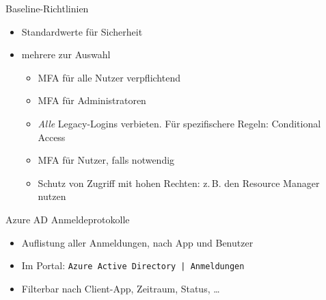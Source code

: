 \begin{flashcard}[Definition]{Baseline-Richtlinien}
    \begin{itemize}
        \item Standardwerte für Sicherheit
        \item mehrere zur Auswahl
            \begin{itemize}
                \item MFA für alle Nutzer verpflichtend
                \item MFA für Administratoren
                \item \emph{Alle} Legacy-Logins verbieten. Für spezifischere Regeln: Conditional Access
                \item MFA für Nutzer, falls notwendig
                \item Schutz von Zugriff mit hohen Rechten: z.\,B. den Resource Manager nutzen
            \end{itemize}

    \end{itemize}
\end{flashcard}



\begin{flashcard}[Definition]{Azure AD Anmeldeprotokolle}
    \begin{itemize}
        \item Auflistung aller Anmeldungen, nach App und Benutzer
        \item Im Portal: \newline
            \texttt{Azure Active Directory | Anmeldungen}
        \item Filterbar nach Client-App, Zeitraum, Status, \ldots
    \end{itemize}
\end{flashcard}
